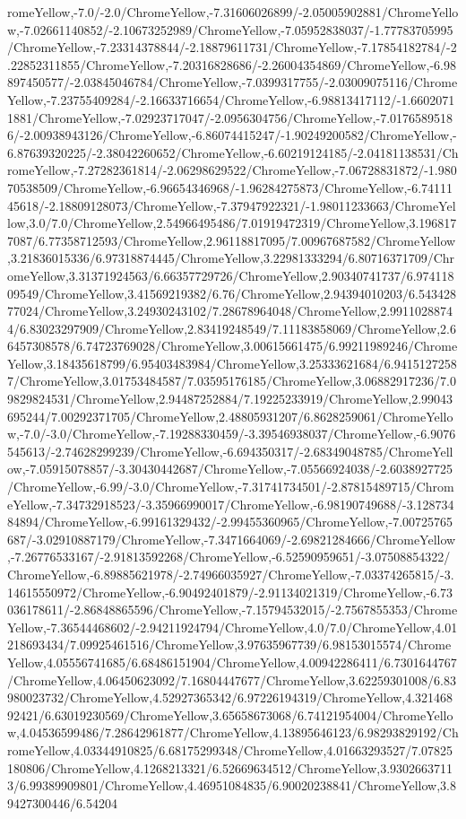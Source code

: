 {\begin{tikzternal}
romeYellow,-7.0/-2.0/ChromeYellow,-7.31606026899/-2.05005902881/ChromeYellow,-7.02661140852/-2.10673252989/ChromeYellow,-7.05952838037/-1.77783705995/ChromeYellow,-7.23314378844/-2.18879611731/ChromeYellow,-7.17854182784/-2.22852311855/ChromeYellow,-7.20316828686/-2.26004354869/ChromeYellow,-6.98897450577/-2.03845046784/ChromeYellow,-7.0399317755/-2.03009075116/ChromeYellow,-7.23755409284/-2.16633716654/ChromeYellow,-6.98813417112/-1.66020711881/ChromeYellow,-7.02923717047/-2.0956304756/ChromeYellow,-7.01765895186/-2.00938943126/ChromeYellow,-6.86074415247/-1.90249200582/ChromeYellow,-6.87639320225/-2.38042260652/ChromeYellow,-6.60219124185/-2.04181138531/ChromeYellow,-7.27282361814/-2.06298629522/ChromeYellow,-7.06728831872/-1.98070538509/ChromeYellow,-6.96654346968/-1.96284275873/ChromeYellow,-6.7411145618/-2.18809128073/ChromeYellow,-7.37947922321/-1.98011233663/ChromeYellow,3.0/7.0/ChromeYellow,2.54966495486/7.01919472319/ChromeYellow,3.1968177087/6.77358712593/ChromeYellow,2.96118817095/7.00967687582/ChromeYellow,3.21836015336/6.97318874445/ChromeYellow,3.22981333294/6.80716371709/ChromeYellow,3.31371924563/6.66357729726/ChromeYellow,2.90340741737/6.97411809549/ChromeYellow,3.41569219382/6.76/ChromeYellow,2.94394010203/6.54342877024/ChromeYellow,3.24930243102/7.28678964048/ChromeYellow,2.99110288744/6.83023297909/ChromeYellow,2.83419248549/7.11183858069/ChromeYellow,2.66457308578/6.74723769028/ChromeYellow,3.00615661475/6.99211989246/ChromeYellow,3.18435618799/6.95403483984/ChromeYellow,3.25333621684/6.94151272587/ChromeYellow,3.01753484587/7.03595176185/ChromeYellow,3.06882917236/7.09829824531/ChromeYellow,2.94487252884/7.19225233919/ChromeYellow,2.99043695244/7.00292371705/ChromeYellow,2.48805931207/6.8628259061/ChromeYellow,-7.0/-3.0/ChromeYellow,-7.19288330459/-3.39546938037/ChromeYellow,-6.9076545613/-2.74628299239/ChromeYellow,-6.694350317/-2.68349048785/ChromeYellow,-7.05915078857/-3.30430442687/ChromeYellow,-7.05566924038/-2.6038927725/ChromeYellow,-6.99/-3.0/ChromeYellow,-7.31741734501/-2.87815489715/ChromeYellow,-7.34732918523/-3.35966990017/ChromeYellow,-6.98190749688/-3.12873484894/ChromeYellow,-6.99161329432/-2.99455360965/ChromeYellow,-7.00725765687/-3.02910887179/ChromeYellow,-7.3471664069/-2.69821284666/ChromeYellow,-7.26776533167/-2.91813592268/ChromeYellow,-6.52590959651/-3.07508854322/ChromeYellow,-6.89885621978/-2.74966035927/ChromeYellow,-7.03374265815/-3.14615550972/ChromeYellow,-6.90492401879/-2.91134021319/ChromeYellow,-6.73036178611/-2.86848865596/ChromeYellow,-7.15794532015/-2.7567855353/ChromeYellow,-7.36544468602/-2.94211924794/ChromeYellow,4.0/7.0/ChromeYellow,4.01218693434/7.09925461516/ChromeYellow,3.97635967739/6.98153015574/ChromeYellow,4.05556741685/6.68486151904/ChromeYellow,4.00942286411/6.7301644767/ChromeYellow,4.06450623092/7.16804447677/ChromeYellow,3.62259301008/6.83980023732/ChromeYellow,4.52927365342/6.97226194319/ChromeYellow,4.32146892421/6.63019230569/ChromeYellow,3.65658673068/6.74121954004/ChromeYellow,4.04536599486/7.28642961877/ChromeYellow,4.13895646123/6.98293829192/ChromeYellow,4.03344910825/6.68175299348/ChromeYellow,4.01663293527/7.07825180806/ChromeYellow,4.1268213321/6.52669634512/ChromeYellow,3.93026637113/6.99389909801/ChromeYellow,4.46951084835/6.90020238841/ChromeYellow,3.89427300446/6.54204
\end{tikzternal}}
